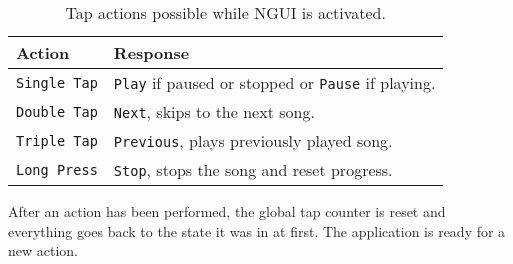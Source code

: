 \begin{table}
\begin{tabular}{|l|l|} \hline
	\textbf{Action} & \textbf{Response} \\\hline
	\texttt{Single Tap} & \texttt{Play} if paused or stopped or \texttt{Pause} if playing. \\\hline
	\texttt{Double Tap} & \texttt{Next}, skips to the next song. \\\hline
	\texttt{Triple Tap} & \texttt{Previous}, plays previously played song. \\\hline
	\texttt{Long Press} & \texttt{Stop}, stops the song and reset progress. \\\hline		
\end{tabular}
\caption[Table caption text]{Tap actions possible while NGUI is activated.}
\label{table:tap}
\end{table}

After an action has been performed, the global tap counter is reset and everything goes back to the state it was in at first. The application is ready for a new action.